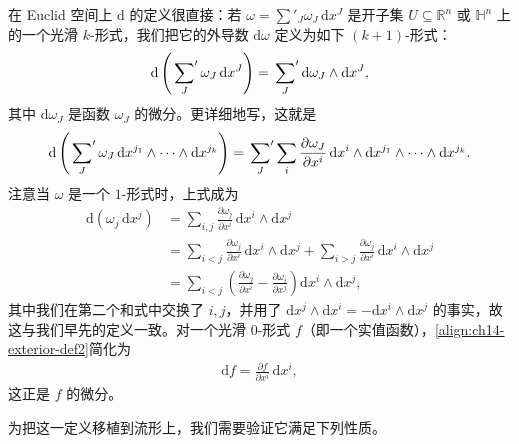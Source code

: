\documentclass[../../main.tex]{subfiles}
\begin{document}
在 Euclid 空间上 $\mathrm{d}$ 的定义很直接：若 $\omega=\sum'_J\omega_J\,\mathrm{d}x^J$ 是开子集 $U\subseteq\mathbb{R}^n$ 或 $\mathbb{H}^n$ 上的一个光滑 $k$-形式，我们把它的外导数 $\mathrm{d}\omega$ 定义为如下 $(k+1)$-形式：
\begin{align}
\mathrm{d}\left(\sideset{}{'}\sum_J\omega_J\,\mathrm{d}x^J\right)
=\sideset{}{'}\sum_J\mathrm{d}\omega_J\wedge\mathrm{d}x^J,\label{align:ch14-exterior-def}
\end{align}
其中 $\mathrm{d}\omega_J$ 是函数 $\omega_J$ 的微分。更详细地写，这就是
\begin{align}
\mathrm{d}\left(\sideset{}{'}\sum_J\omega_J\,\mathrm{d}x^{j_1}\wedge\cdots\wedge\mathrm{d}x^{j_k}\right)
=\sideset{}{'}\sum_J\sum_i\frac{\partial\omega_J}{\partial x^i}\,
\mathrm{d}x^i\wedge\mathrm{d}x^{j_1}\wedge\cdots\wedge\mathrm{d}x^{j_k}.\label{align:ch14-exterior-def2}
\end{align}
注意当 $\omega$ 是一个 $1$-形式时，上式成为
\begin{align*}
\mathrm{d}(\omega_j\,\mathrm{d}x^j)
&=\sum_{i,j}\frac{\partial\omega_j}{\partial x^i}\,\mathrm{d}x^i\wedge\mathrm{d}x^j\\
&=\sum_{i<j}\frac{\partial\omega_j}{\partial x^i}\,\mathrm{d}x^i\wedge\mathrm{d}x^j
+\sum_{i>j}\frac{\partial\omega_j}{\partial x^i}\,\mathrm{d}x^i\wedge\mathrm{d}x^j\\
&=\sum_{i<j}\left(\frac{\partial\omega_j}{\partial x^i}-\frac{\partial\omega_i}{\partial x^j}\right)\mathrm{d}x^i\wedge\mathrm{d}x^j,
\end{align*}
其中我们在第二个和式中交换了 $i,j$，并用了 $\mathrm{d}x^j\wedge\mathrm{d}x^i=-\mathrm{d}x^i\wedge\mathrm{d}x^j$ 的事实，故这与我们早先的定义一致。对一个光滑 $0$-形式 $f$（即一个实值函数），\eqref{align:ch14-exterior-def2}简化为
\begin{align*}
\mathrm{d}f=\frac{\partial f}{\partial x^i}\,\mathrm{d}x^i,
\end{align*}
这正是 $f$ 的微分。

为把这一定义移植到流形上，我们需要验证它满足下列性质。
\end{document}
